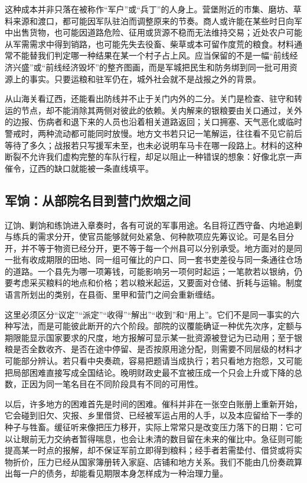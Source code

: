 这种成本并非只落在被称作“军户”或“兵丁”的人身上。营堡附近的市集、磨坊、草料来源和渡口，都可能因军队驻泊而调整原来的节奏。商人或许能在某些时日向军中出售货物，也可能因道路危险、征用或货源不稳而无法维持交易；近处农户可能从军需需求中得到销路，也可能先失去役畜、柴草或本可留作度荒的粮食。材料通常不能替我们判定哪一种结果在某一个村子占上风。应当保留的不是一幅“前线经济兴盛”或“前线经济毁坏”的整齐图画，而是军城把民生和防务绑到同一批可用资源上的事实。只要运粮和驻军仍在，城外社会就不是战报之外的背景。

从山海关看辽西，还能看出防线并不止于关门内外的二分。关门是检查、驻守和转运的节点，却不能消除其两侧对彼此的依赖。关内解来的银粮要由关口通过，关外的边报、伤病者和退下来的人员也沿着相关道路返回；关口拥塞、天气恶化或临时警戒时，两种流动都可能同时放慢。地方文书若只记一笔解运，往往看不见它前后等待了多久；战报若只写援军未至，也未必说明车马卡在哪一段路上。材料的这种断裂不允许我们虚构完整的车队行程，却足以阻止一种错误的想象：好像北京一声催令，辽西的缺口就能被一条直线填平。

\subsection{军饷：从部院名目到营门炊烟之间}

辽饷、剿饷和练饷进入章奏时，各有可说的军事用途。名目将辽西守备、内地追剿与练兵的需求分开，使官员能够就何处紧急、何种款项应先筹议论。可是名目分开，并不等于物资已经分开，更不等于每一个州县可以分别承受。地方面对的是同一批有收成期限的田地、同一组可催比的户口、同一套书吏差役与同一条通往仓场的道路。一个县先为哪一项筹钱，可能影响另一项何时起运；一笔款若以银纳，仍要考虑采买粮料的地点和价格；若以粮米起运，又要面对仓储、折耗与运输。制度语言所划出的类别，在县衙、里甲和营门之间会重新缠结。

这里必须区分“议定”“派定”“收得”“解出”“收到”和“用上”。它们不是同一事实的六种写法，而是可能彼此断开的六个阶段。部院的议覆能确证一种优先次序，定额与期限能显示国家要求的尺度，地方报解可显示某一批资源被登记为已动用；至于银粮是否全数收齐、是否在途中停留、是否按原用途分配，则需要不同层级的材料才可能部分辨认。若只看中央奏疏，容易把题请当成执行；若只看地方抱怨，又可能把局部困难直接写成全国结论。晚明财政史最不宜被压成一个只会上升或下降的总数，正因为同一笔名目在不同阶段具有不同的可用性。

以后，许多地方的困难首先是时间的困难。催科并非在一张空白账册上重新开始，它会碰到旧欠、灾报、乡里借贷、已经被军运占用的人手，以及本应留给下一季的种子与牲畜。缓征听来像把压力移开，实际上常常只是改变压力落下的日期：它可以让眼前无力交纳者暂得喘息，也会让未清的数目留在未来的催比中。急征则可能提高某一时点的报解，却不保证军前立即得到粮料；经手者若需垫付、借贷或将实物折价，压力已经从国家簿册转入家庭、店铺和地方关系。我们不能由几份奏疏算出每一户的债务，却能看见期限本身怎样成为一种治理力量。

